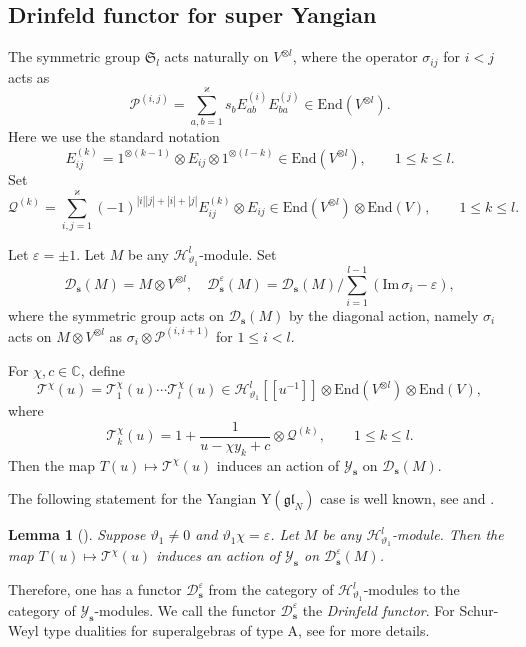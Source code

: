 \documentclass[11pt,reqno]{amsart}
\numberwithin{equation}{section}
\newtheorem{lem}[thm]{Lemma}
\theoremstyle{definition}
\theoremstyle{remark}
\newcommand{\beq}{\begin{equation}}
\newcommand{\eeq}{\end{equation}}
\newcommand{\mc}{\mathcal}
\newcommand{\gl}{\mathfrak{gl}}
\newcommand{\End}{\mathrm{End}}
\newcommand{\bC}{\mathbb{C}}
\newcommand{\lle}{\leqslant}
\newcommand{\YMN}{{\mathscr{Y}_{\bm s}}}
\newcommand{\ka}{\varkappa}
\newcommand{\ve}{\varepsilon}
\newcommand{\s}{{\bm s}}
\begin{document}
\subsection{Drinfeld functor for super Yangian}
The symmetric group $\mathfrak S_l$ acts naturally on $V^{\otimes l}$, where the operator $\sigma_{ij}$ for $i<j$ acts as
\beq\label{eq perm}
\mathcal P^{(i,j)}=\sum_{a,b=1}^\ka s_b E_{ab}^{(i)}E_{ba}^{(j)}\in \End(V^{\otimes l}).
\eeq
Here we use the standard notation
\[
E_{ij}^{(k)}=1^{\otimes (k-1)}\otimes E_{ij}\otimes 1^{\otimes (l -k)}\in \End(V^{\otimes l}),\qquad 1\lle k\lle l.
\]
Set
$$
\mc Q^{(k)}=\sum_{i,j=1}^\ka (-1)^{|i||j|+|i|+|j|}E_{ij}^{(k)}\otimes E_{ij}\in \End(V^{\otimes l})\otimes \End(V),\qquad 1\lle k\lle l.
$$

Let $\ve=\pm 1$. Let $M$ be any $\mathscr H_{\vartheta_1}^l$-module. Set
\[
\mc D_\s(M)=M\otimes V^{\otimes l},\quad \mc D_{\s}^{\ve}(M)=\mc D_{\s}(M)/\sum_{i=1}^{l-1}(\mathrm{Im}\, \sigma_i-\ve),
\]
where the symmetric group acts on $\mc D_\s(M)$ by the diagonal action, namely $\sigma_i$ acts on $M\otimes V^{\otimes l}$ as $\sigma_i\otimes \mc P^{(i,i+1)}$ for $1\lle i<l$.

For $\chi,c\in\bC$, define
\[
\mathcal T^{\chi}(u)=\mc T_1^\chi(u)\cdots \mc T^{\chi}_l(u)\in \mathscr H_{\vartheta_1}^l[[u^{-1}]]\otimes \End(V^{\otimes l})\otimes \End(V),
\]
where
\[
\mc T_k^\chi(u)=1+\frac{1}{u-\chi y_k+c}\otimes \mc Q^{(k)},\qquad 1\lle k \lle l.
\]
Then the map $T(u)\mapsto \mc T^{\chi}(u)$ induces an action of $\YMN$ on $\mc D_\s(M)$.

The following statement for the Yangian $\mathrm{Y}(\gl_N)$ case  is well known, see \cite[Proposition 2]{Arakawa1999} and \cite[Theorem 1]{Drinfeld198degenerate}.
\begin{lem}[{\cite[Lemma 4.2]{Lu2021jacobi}}]\label{lem:D-functor-A}
Suppose $\vartheta_1\ne 0$ and $\vartheta_1 \chi=\ve$. Let $M$ be any $\mathscr H_{\vartheta_1}^l$-module. Then the map $T(u)\mapsto \mc T^{\chi}(u)$ induces an action of $\YMN$ on $\mc D_\s^\ve(M)$.
\end{lem}

Therefore, one has a functor $\mc D_\s^\ve$ from the category of $\mathscr H_{\vartheta_1}^l$-modules to the category of $\YMN$-modules. We call the functor $\mc D_\s^\ve$ the {\it Drinfeld functor}. For Schur-Weyl type dualities for superalgebras of type A, see \cite{Sergeev1984tensor,Berele1987hook,Moon2003highest,Mitsuhashi2006schur,Flicker2020affine,Lu2021jacobi,Lu2021gelfand,Kwon2022super,Lu2023schur,Shen2022quantum,jankovic2023schur} for more details.
\end{document}
